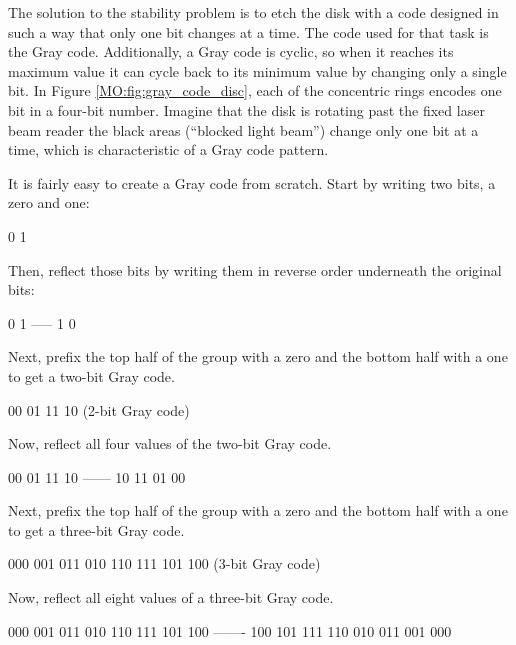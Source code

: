 The solution to the stability problem is to etch the disk with a code designed in such a way that only one bit changes at a time. The code used for that task is the Gray code. Additionally, a Gray code is cyclic, so when it reaches its maximum value it can cycle back to its minimum value by changing only a single bit. In Figure \ref{MO:fig:gray_code_disc}, each of the concentric rings encodes one bit in a four-bit number. Imagine that the disk is rotating past the fixed laser beam reader \textemdash the black areas (``blocked light beam'') change only one bit at a time, which is characteristic of a Gray code pattern.

It is fairly easy to create a Gray code from scratch. Start by writing two bits, a zero and one: 

\begin{binDisp}[commandchars=~\[\]]
     0
     1
\end{binDisp}

Then, reflect those bits by writing them in reverse order underneath the original bits:

\begin{binDisp}[commandchars=~\[\]]
     0
     1
   -----
     1
     0
\end{binDisp}

Next, prefix the top half of the group with a zero and the bottom half with a one to get a two-bit Gray code. 

\begin{binDisp}
     00
     01
     11
     10  (2-bit Gray code)
\end{binDisp}

Now, reflect all four values of the two-bit Gray code.

\begin{binDisp}
     00
     01
     11
     10
   ------
     10
     11
     01
     00
\end{binDisp}

Next, prefix the top half of the group with a zero and the bottom half with a one to get a three-bit Gray code.

\begin{binDisp}
     000
     001
     011
     010
     110
     111
     101
     100  (3-bit Gray code)
\end{binDisp}

Now, reflect all eight values of a three-bit Gray code.

\begin{binDisp}
     000
     001
     011
     010
     110
     111
     101
     100
   -------
     100
     101
     111
     110
     010
     011
     001
     000
\end{binDisp}

